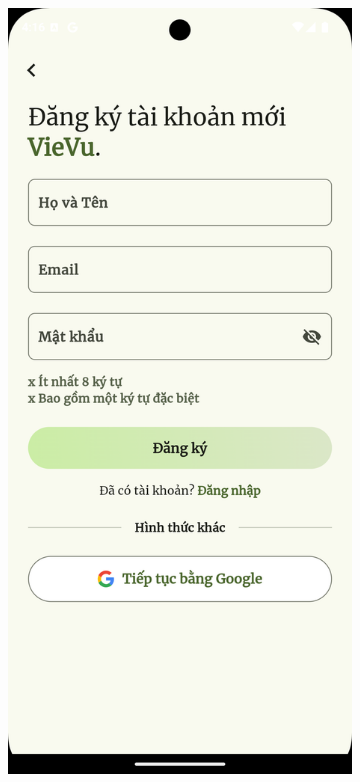 \begin{figure}[H]
    \centering
    \begin{subfigure}{0.326\textwidth}
        \includegraphics[width=1\linewidth]{figures/c4/system_func/sign_up.png}

\end{subfigure}
\end{figure}

